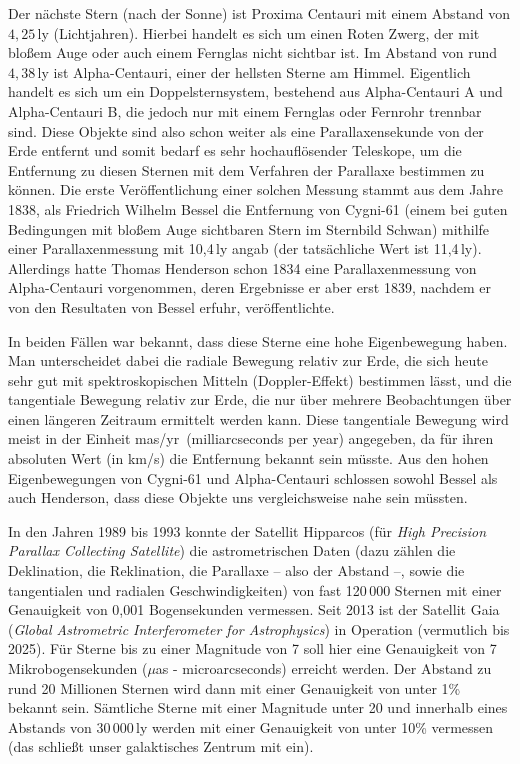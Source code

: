 Der n\"achste Stern (nach der Sonne) ist Proxima Centauri 
mit einem Abstand von $4,25$\,ly (Lichtjahren). 
Hierbei handelt es sich um einen Roten Zwerg, der mit blo\ss em Auge oder auch einem Fernglas
nicht sichtbar ist. Im Abstand von rund $4,38$\,ly ist Alpha-Centauri, 
einer der hellsten Sterne am Himmel. 
Eigentlich handelt es sich um ein Doppelsternsystem, bestehend aus Alpha-Centauri A und Alpha-Centauri B, 
die jedoch nur mit einem Fernglas oder Fernrohr trennbar sind. Diese Objekte sind also schon weiter
als eine Parallaxensekunde von der Erde entfernt und somit bedarf es sehr hochaufl\"osender 
Teleskope, um die Entfernung zu diesen Sternen mit dem Verfahren der Parallaxe bestimmen zu k\"onnen.
Die erste Ver\"offentlichung einer solchen Messung stammt aus dem Jahre 1838, als Friedrich Wilhelm
Bessel 
die Entfernung von Cygni-61 
(einem bei guten Bedingungen mit blo\ss em Auge sichtbaren
Stern im Sternbild Schwan) mithilfe einer Parallaxenmessung mit 10,4\,ly angab (der tats\"achliche Wert ist
11,4\,ly). Allerdings hatte Thomas Henderson 
schon 1834 eine Parallaxenmessung von Alpha-Centauri
vorgenommen, deren Ergebnisse er aber erst 1839, nachdem er von den Resultaten von Bessel erfuhr,
ver\"offentlichte. 

In beiden F\"allen war bekannt, dass diese Sterne eine hohe
Eigenbewegung haben. Man unterscheidet dabei die radiale Bewegung relativ zur Erde, die sich heute
sehr gut mit spektroskopischen Mitteln (Doppler-Effekt) bestimmen l\"asst, und die tangentiale Bewegung
relativ zur Erde, die nur \"uber mehrere Beobachtungen \"uber einen l\"angeren Zeitraum ermittelt werden
kann. Diese tangentiale Bewegung wird meist in der Einheit \glqq mas/yr\grqq\ (milliarcseconds per year) 
angegeben, da f\"ur ihren absoluten Wert (in km/s) die Entfernung bekannt sein m\"usste. Aus den hohen
Eigenbewegungen von Cygni-61 und Alpha-Centauri schlossen sowohl Bessel als auch Henderson, dass
diese Objekte uns vergleichsweise nahe sein m\"ussten. 

In den Jahren 1989 bis 1993 konnte der Satellit 
Hipparcos (f\"ur \textit{High Precision Parallax Collecting Satellite})  
die astrometrischen Daten (dazu z\"ahlen die Deklination, die Reklination, die Parallaxe -- also der Abstand --,
sowie die tangentialen und radialen Geschwindigkeiten) von fast 120\,000 Sternen mit einer Genauigkeit
von 0,001 Bogensekunden vermessen. 
Seit 2013 ist der Satellit Gaia (\textit{Global Astrometric Interferometer for
Astrophysics}) in Operation (vermutlich bis 2025). F\"ur Sterne bis zu einer Magnitude von 7 soll hier eine
Genauigkeit von 7 Mikrobogensekunden ($\mu$as - microarcseconds) erreicht werden. Der Abstand zu
rund 20 Millionen Sternen wird dann mit einer Genauigkeit von unter 1\% bekannt sein. S\"amtliche
Sterne mit einer Magnitude unter 20 und innerhalb eines Abstands von 30\,000\,ly werden mit einer Genauigkeit 
von unter 10\% vermessen (das schlie\ss t unser galaktisches Zentrum mit ein). 

